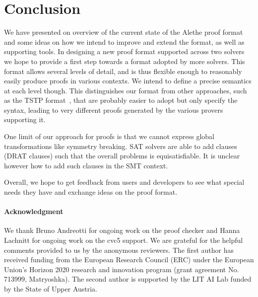 \documentclass[submission,copyright,creativecommons]{eptcs}
\begin{document}
\section{Conclusion}
\label{sec:concl}

We have presented on overview of the current state of the Alethe proof format
and some ideas on how we intend to improve and extend the format, as well as
supporting tools.
%
In designing a new proof format supported across two solvers we hope to provide
a first step towards a format adopted by more solvers.
%
This format allows several levels of detail, and is thus flexible enough to reasonably
easily produce proofs in various contexts.  We intend to define a precise
semantics at each level though.
%
This distinguishes our format from other approaches, such as the TSTP
format~\cite{Sutcliffe2004}, that are probably easier to adopt but only
specify the syntax, leading to very different proofs generated by the various
provers supporting it.

One limit of our approach for proofs is that we cannot express global
transformations like symmetry breaking. SAT solvers are able to add clauses
(DRAT clauses) such that the overall problems is equisatisfiable. It is unclear
however how to add such clauses in the SMT context.

Overall, we hope to get feedback from users and developers to see what special
needs they have and exchange ideas on the proof format.

\paragraph{Acknowledgment}
We thank Bruno Andreotti for ongoing work on the proof checker and
Hanna Lachnitt for ongoing work on the cvc5 support.
We are grateful for the helpful comments provided to us by the anonymous
reviewers.
The first author has received funding from the European Research Council (ERC)
under the European Union’s Horizon 2020 research and innovation program (grant
agreement No. 713999, Matryoshka).
The second author is supported by the LIT AI Lab funded by the State of Upper Austria.



\end{document}
